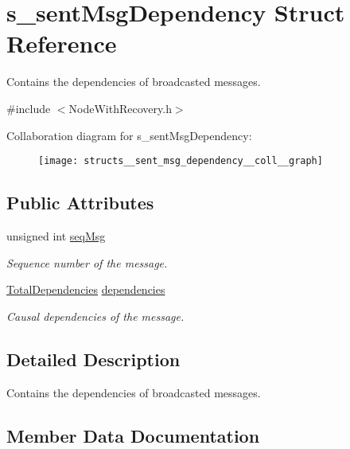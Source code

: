 \hypertarget{structs__sent_msg_dependency}{}\section{s\+\_\+sent\+Msg\+Dependency Struct Reference}
\label{structs__sent_msg_dependency}


Contains the dependencies of broadcasted messages.  




{\ttfamily \#include $<$Node\+With\+Recovery.\+h$>$}



Collaboration diagram for s\+\_\+sent\+Msg\+Dependency\+:
\nopagebreak
\begin{figure}[H]
\begin{center}
\leavevmode
\texttt{[image: structs\_\_sent\_msg\_dependency\_\_coll\_\_graph]}
\end{center}
\end{figure}
\subsection*{Public Attributes}
\begin{DoxyCompactItemize}
\item 
unsigned int \hyperlink{structs__sent_msg_dependency_afd3ba2f762d695961fed00fb401bc3e7}{seq\+Msg}
\begin{DoxyCompactList}\small\item\em Sequence number of the message. \end{DoxyCompactList}\item 
\hyperlink{class_total_dependencies}{Total\+Dependencies} \hyperlink{structs__sent_msg_dependency_ab7ece51991fbcba599580914571a32cc}{dependencies}
\begin{DoxyCompactList}\small\item\em Causal dependencies of the message. \end{DoxyCompactList}\end{DoxyCompactItemize}


\subsection{Detailed Description}
Contains the dependencies of broadcasted messages. 

\subsection{Member Data Documentation}
\mbox{\label{structs__sent_msg_dependency_ab7ece51991fbcba599580914571a32cc}} 
